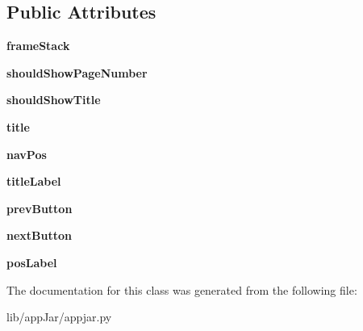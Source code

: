 \subsection*{Public Attributes}
\begin{DoxyCompactItemize}
\item 
\mbox{\label{classappjar_1_1_paged_window_ae956596353d41af5e3e425ef006ad760}} 
{\bfseries frame\+Stack}
\item 
\mbox{\label{classappjar_1_1_paged_window_a9f7ef5247154d59131ece1b6039dc4e5}} 
{\bfseries should\+Show\+Page\+Number}
\item 
\mbox{\label{classappjar_1_1_paged_window_a2fa18c8852244cb927aab536a270249a}} 
{\bfseries should\+Show\+Title}
\item 
\mbox{\label{classappjar_1_1_paged_window_aeb1207ee071528575f8608d0d510a26b}} 
{\bfseries title}
\item 
\mbox{\label{classappjar_1_1_paged_window_a1acb9b669889929fcd19ce940461bc2e}} 
{\bfseries nav\+Pos}
\item 
\mbox{\label{classappjar_1_1_paged_window_a3c0bce18d27d714b5a5362f7e1038f8b}} 
{\bfseries title\+Label}
\item 
\mbox{\label{classappjar_1_1_paged_window_a87669de592d04c82f6d2294dac890d9e}} 
{\bfseries prev\+Button}
\item 
\mbox{\label{classappjar_1_1_paged_window_aa48bd7f718b780ecb5b0ea3c5e403411}} 
{\bfseries next\+Button}
\item 
\mbox{\label{classappjar_1_1_paged_window_abbc2bad05660bc3ac2ac19c124916078}} 
{\bfseries pos\+Label}
\end{DoxyCompactItemize}


The documentation for this class was generated from the following file\+:\begin{DoxyCompactItemize}
\item 
lib/app\+Jar/appjar.\+py\end{DoxyCompactItemize}
